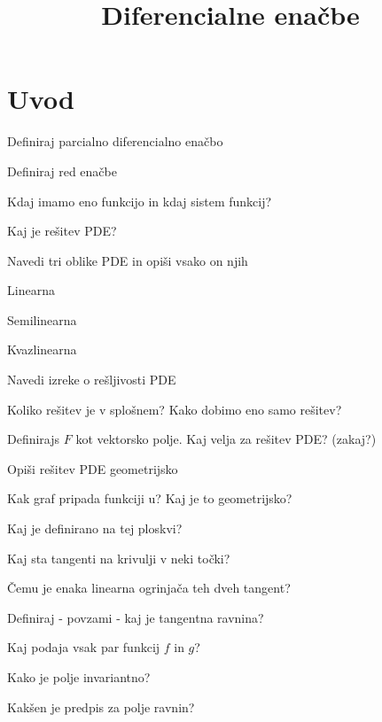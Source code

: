 \documentclass{article}
\title{Diferencialne enačbe}
\begin{document}
    \maketitle
    
    \section{Uvod}
    \begin{enumerate}
        \item Definiraj parcialno diferencialno enačbo
        \item Definiraj red enačbe
        {\color{red}\item Kdaj imamo eno funkcijo in kdaj sistem funkcij?}
        \item Kaj je rešitev PDE?
        \item Navedi tri oblike PDE in opiši vsako on njih
        \begin{itemize}
            \item Linearna
            {\color{red}\item Semilinearna}
            {\color{red}\item Kvazlinearna}
        \end{itemize}
        \item Navedi izreke o rešljivosti PDE
        \item Koliko rešitev je v splošnem? Kako dobimo eno samo rešitev?
        {\color{red}\item Definirajs $F$ kot vektorsko polje. Kaj velja za rešitev PDE? (zakaj?)}
        \item Opiši rešitev PDE geometrijsko
        \begin{itemize}
            \item Kak graf pripada funkciji u? Kaj je to geometrijsko?
            {\color{red}\item Kaj je definirano na tej ploskvi?}
            \item Kaj sta tangenti na krivulji v neki točki?
            {\color{red}\item Čemu je enaka linearna ogrinjača teh dveh tangent?}
        \end{itemize}
        \item Definiraj - povzami - kaj je tangentna ravnina?
        {\color{red}\item Kaj podaja vsak par funkcij $f$ in $g$?}
        {\color{red}\item Kako je polje invariantno?}
        {\color{red}\item Kakšen je predpis za polje ravnin?}

\end{enumerate}
\end{document}
